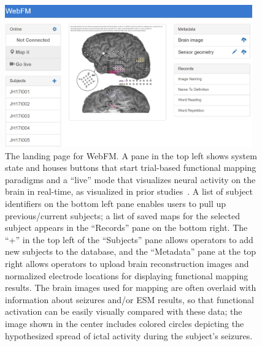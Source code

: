 \documentclass[utf8]{frontiersSCNS}
\begin{document}
\begin{figure}[h!]
\begin{center}
\includegraphics[width=0.95\textwidth]{figures/f3_webfm_landing}%
\end{center}
\caption{The landing page for WebFM.  A pane in the top left shows system state and houses buttons that start trial-based functional mapping paradigms and a ``live'' mode that visualizes neural activity on the brain in real-time, as visualized in prior studies~\citep{lachaux_braintv:_2007}.  A list of subject identifiers on the bottom left pane enables users to pull up previous/current subjects; a list of saved maps for the selected subject appears in the ``Records'' pane on the bottom right.  The ``+'' in the top left of the ``Subjects'' pane allows operators to add new subjects to the database, and the ``Metadata'' pane at the top right allows operators to upload brain reconstruction images and normalized electrode locations for displaying functional mapping results.  The brain images used for mapping are often overlaid with information about seizures and/or ESM results, so that functional activation can be easily visually compared with these data; the image shown in the center includes colored circles depicting the hypothesized spread of ictal activity during the subject's seizures.}\label{fig:webfm_landing}
\end{figure}
\end{document}
